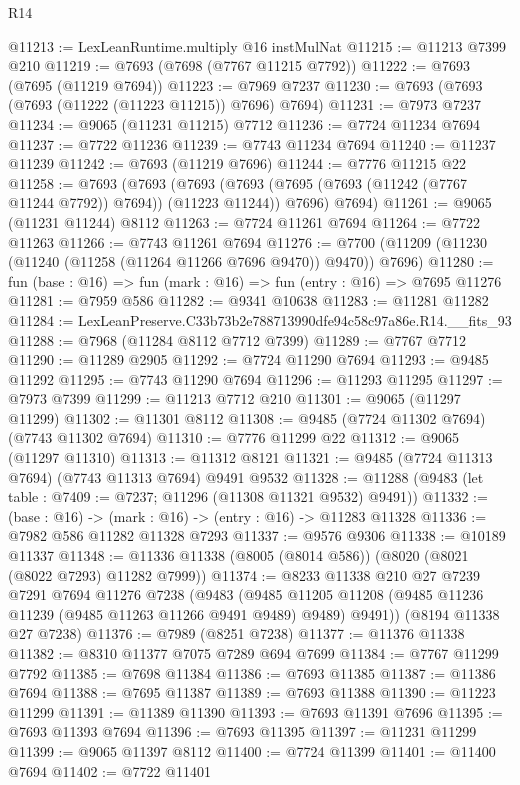 \begin{lexlean}{R14}
\begin{coremodule}
@11213 := LexLeanRuntime.multiply @16 instMulNat
@11215 := @11213 @7399 @210
@11219 := @7693 (@7698 (@7767 @11215 @7792))
@11222 := @7693 (@7695 (@11219 @7694))
@11223 := @7969 @7237
@11230 := @7693 (@7693 (@7693 (@11222 (@11223 @11215)) @7696) @7694)
@11231 := @7973 @7237
@11234 := @9065 (@11231 @11215) @7712
@11236 := @7724 @11234 @7694
@11237 := @7722 @11236
@11239 := @7743 @11234 @7694
@11240 := @11237 @11239
@11242 := @7693 (@11219 @7696)
@11244 := @7776 @11215 @22
@11258 := @7693
    (@7693
      (@7693 (@7693 (@7695 (@7693 (@11242 (@7767 @11244 @7792)) @7694)) (@11223 @11244)) @7696)
      @7694)
@11261 := @9065 (@11231 @11244) @8112
@11263 := @7724 @11261 @7694
@11264 := @7722 @11263
@11266 := @7743 @11261 @7694
@11276 := @7700 (@11209 (@11230 (@11240 (@11258 (@11264 @11266 @7696 @9470)) @9470)) @7696)
@11280 := fun (base : @16) => fun (mark : @16) => fun (entry : @16) => @7695 @11276
@11281 := @7959 @586
@11282 := @9341 @10638
@11283 := @11281 @11282
@11284 := LexLeanPreserve.C33b73b2e788713990dfe94c58c97a86e.R14.__fits_93
@11288 := @7968 (@11284 @8112 @7712 @7399)
@11289 := @7767 @7712
@11290 := @11289 @2905
@11292 := @7724 @11290 @7694
@11293 := @9485 @11292
@11295 := @7743 @11290 @7694
@11296 := @11293 @11295
@11297 := @7973 @7399
@11299 := @11213 @7712 @210
@11301 := @9065 (@11297 @11299)
@11302 := @11301 @8112
@11308 := @9485 (@7724 @11302 @7694) (@7743 @11302 @7694)
@11310 := @7776 @11299 @22
@11312 := @9065 (@11297 @11310)
@11313 := @11312 @8121
@11321 := @9485 (@7724 @11313 @7694) (@7743 @11313 @7694) @9491 @9532
@11328 := @11288 (@9483 (let table : @7409 := @7237; @11296 (@11308 @11321 @9532) @9491))
@11332 := (base : @16) -> (mark : @16) -> (entry : @16) -> @11283 @11328
@11336 := @7982 @586 @11282 @11328 @7293
@11337 := @9576 @9306
@11338 := @10189 @11337
@11348 := @11336 @11338 (@8005 (@8014 @586)) (@8020 (@8021 (@8022 @7293) @11282 @7999))
@11374 := @8233
    @11338
    @210
    @27
    @7239
    @7291
    @7694
    @11276
    @7238
    (@9483
      (@9485 @11205 @11208 (@9485 @11236 @11239 (@9485 @11263 @11266 @9491 @9489) @9489) @9491))
    (@8194 @11338 @27 @7238)
@11376 := @7989 (@8251 @7238)
@11377 := @11376 @11338
@11382 := @8310 @11377 @7075 @7289 @694 @7699
@11384 := @7767 @11299 @7792
@11385 := @7698 @11384
@11386 := @7693 @11385
@11387 := @11386 @7694
@11388 := @7695 @11387
@11389 := @7693 @11388
@11390 := @11223 @11299
@11391 := @11389 @11390
@11393 := @7693 @11391 @7696
@11395 := @7693 @11393 @7694
@11396 := @7693 @11395
@11397 := @11231 @11299
@11399 := @9065 @11397 @8112
@11400 := @7724 @11399
@11401 := @11400 @7694
@11402 := @7722 @11401

\end{coremodule}
\end{lexlean}
